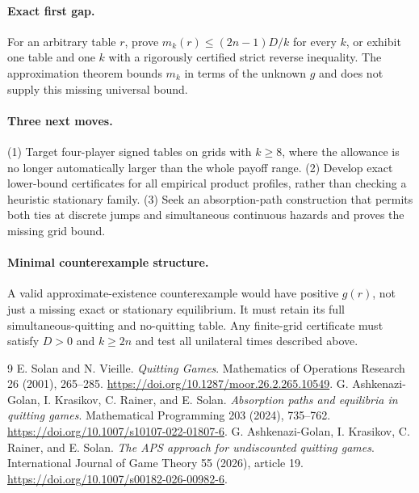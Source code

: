\documentclass[11pt,a4paper]{article}
\theoremstyle{definition}
\theoremstyle{remark}
\begin{document}
\paragraph{Exact first gap.}
For an arbitrary table $r$, prove $m_k(r)\leq(2n-1)D/k$ for every $k$, or exhibit one table and one $k$ with a rigorously certified strict reverse inequality. The approximation theorem bounds $m_k$ in terms of the unknown $g$ and does not supply this missing universal bound.

\paragraph{Three next moves.}
(1) Target four-player signed tables on grids with $k\geq8$, where the allowance is no longer automatically larger than the whole payoff range. (2) Develop exact lower-bound certificates for all empirical product profiles, rather than checking a heuristic stationary family. (3) Seek an absorption-path construction that permits both ties at discrete jumps and simultaneous continuous hazards and proves the missing grid bound.

\paragraph{Minimal counterexample structure.}
A valid approximate-existence counterexample would have positive $g(r)$, not just a missing exact or stationary equilibrium. It must retain its full simultaneous-quitting and no-quitting table. Any finite-grid certificate must satisfy $D>0$ and $k\geq2n$ and test all unilateral times described above.

\begin{thebibliography}{9}
 E. Solan and N. Vieille. \emph{Quitting Games}. Mathematics of Operations Research 26 (2001), 265--285. \url{https://doi.org/10.1287/moor.26.2.265.10549}.
 G. Ashkenazi-Golan, I. Krasikov, C. Rainer, and E. Solan. \emph{Absorption paths and equilibria in quitting games}. Mathematical Programming 203 (2024), 735--762. \url{https://doi.org/10.1007/s10107-022-01807-6}.
 G. Ashkenazi-Golan, I. Krasikov, C. Rainer, and E. Solan. \emph{The APS approach for undiscounted quitting games}. International Journal of Game Theory 55 (2026), article 19. \url{https://doi.org/10.1007/s00182-026-00982-6}.
\end{thebibliography}
\end{document}
